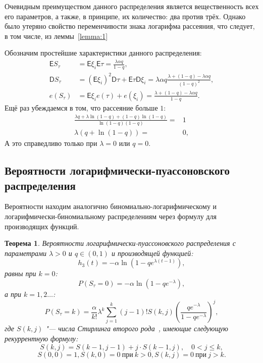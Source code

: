\documentclass[12pt, specialist, subf, substylefile = spbu.rtx]{disser}
\newtheorem{theorem}{Теорема}
\begin{document}
	Очевидным преимуществом данного распределения является вещественность всех его параметров, а также, в принципе, их количество: два против трёх. Однако было утеряно свойство переменчивости знака логарифма рассеяния, что следует, в том числе, из леммы~\ref{lemma:1}
	
	Обозначим простейшие характеристики данного распределения:
	\[
		\begin{aligned}
			\mathsf{E} S _\tau &= \mathsf{E} \xi _i \mathsf{E} \tau = \frac {\lambda \alpha q} {1 - q},\\
			\mathsf{D} S _\tau &= \left( \mathsf{E} \xi _i \right) ^2 \mathsf{D} \tau + \mathsf{E} \tau \mathsf{D} \xi _i = \lambda \alpha q \frac {\lambda + (1 - q) - \lambda \alpha q} {(1 - q) ^2},\\
			e (S _\tau) &= \mathsf{E} \xi _i e (\tau) + e (\xi _i) = \frac {\lambda + (1 - q) - \lambda \alpha q} {1 - q}.
		\end{aligned}
	\]
	Ещё раз убеждаемся в том, что рассеяние больше $1$:
	\[
		\begin{aligned}
			\frac {\lambda q + \lambda \ln (1 - q) + (1 - q) \ln(1 - q)} {\ln(1 - q) (1 - q)} =& 1\\
			\lambda (q + \ln (1 - q)) =& 0,
		\end{aligned}
	\]
	А это справедливо только при $\lambda = 0$ или $q = 0$.
	
	\subsection{Вероятности логарифмически-пуассоновского распределения}
	
	Вероятности находим аналогично биномиально-логарифмическому и логарифмически-биномиальному распределениям через формулу для производящих функций.

	\begin{theorem}
		\label{theorem:probLPR1}
		Вероятности логарифмически-пуассоновского распределения с параметрами $\lambda > 0$ и $q \in (0, 1)$ и производящей функцией:
		\[
		h _3 (t) = -\alpha \ln \left(1 - q e ^{\lambda (t - 1)}\right),
		\]
		равны при $k = 0$:
		\[
			P(S _\tau = 0) = -\alpha \ln\left(1 - q e ^{-\lambda}\right),
		\]
		а при $k = 1, 2 \dots$:
		\begin{equation}\label{lpr:prob1}
			P(S _\tau = k) = \frac \alpha {k !} \lambda ^k \sum \limits _{j = 1} ^{k} (j - 1)! S(k, j) \left(\frac {q e ^{-\lambda}} {1 - q e ^{-\lambda}}\right) ^j,
		\end{equation}
		где $S(k, j)$ "--- числа Стирлинга второго рода~\cite{bib:knuth1998}, имеющие следующую рекуррентную формулу:
		\[
			S(k, j) = S(k - 1, j - 1) + j \cdot S(k - 1, j), \quad 0 < j \leqslant k,
		\]
		\[
			S(0, 0) = 1, S(k, 0) = 0~ \text{при}~ k > 0, S(k, j) = 0~ \text{при}~ j > k.
		\]
	\end{theorem}
\end{document}

